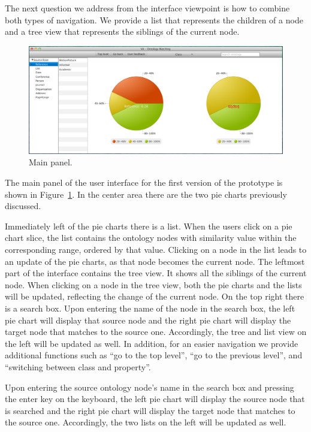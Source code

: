 The next question we address from the interface viewpoint is how to
combine both types of navigation. %
We provide a list that represents the children of a node and a tree
view that represents the siblings of the current node. 

\begin{figure}[!ht]
	\centering
	\includegraphics[width=6.5in]{pics/gui.png}
	\caption{Main panel.}
	\label{fig:main_panel}
\end{figure}

The main panel of the user interface for the first version of the
prototype is shown in Figure~\ref{fig:main_panel}. In the center area
there are the two pie charts previously discussed. 

Immediately left of the pie charts there is a list. When the users click on a pie
chart slice, the list contains the ontology nodes with similarity
value within the corresponding range, ordered by that value. Clicking on a node in the list leads to an update of the
pie charts, as that node becomes the current node. The 
leftmost part of the interface contains the tree view. It shows all
the siblings of
the current node. When clicking on a node in the tree view, both the
pie charts and the lists will be updated, reflecting the change of the
current node. On the top right there is a
search box. Upon entering the name of the node in the search box, the
left pie chart will display that source node and the right pie chart
will display the target node that matches to the source
one. Accordingly, the tree and list view on the left will be updated as well. 
In addition, for an easier navigation we provide additional functions such as ``go
to the top level'', ``go to the previous level'', and ``switching
between class and property''. 

Upon entering the source ontology node's name in the search box and pressing the enter key on the keyboard, the left pie chart will display the source node that is searched and the right pie chart will display the target node that matches to the source one. Accordingly, the two lists on the left will be updated as well.


